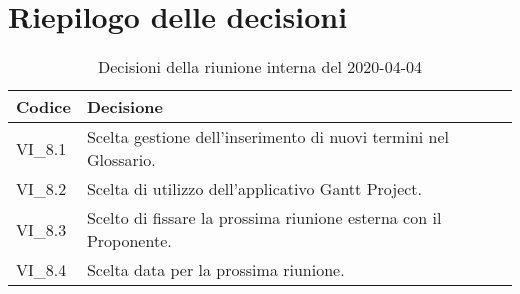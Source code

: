 \section{Riepilogo delle decisioni}
\begin{longtable}{ 
	 >{\centering}p{} >{}p{} }
	
	\caption{Decisioni della riunione interna del 2020-04-04}\\	
	
	\textbf{\color{white}Codice} & 
	\textbf{\color{white}Decisione} 
	\tabularnewline  
	\endhead
	
	VI\_8.1 & Scelta gestione dell'inserimento di nuovi termini nel Glossario. \\
	VI\_8.2 & Scelta di utilizzo dell'applicativo Gantt Project. \\
	VI\_8.3 & Scelto di fissare la prossima riunione esterna con il Proponente. \\
	VI\_8.4 & Scelta data per la prossima riunione. \\
	
\end{longtable}